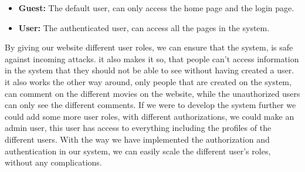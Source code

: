 \begin{itemize}
    \item \textbf{Guest:} The default user, can only access the home page and the login page.
    \item \textbf{User:} The authenticated user, can access all the pages in the system.
\end{itemize}

By giving our website different user roles, we can
ensure that the system, is safe against incoming
attacks. it also makes it so, that people can't access
information in the system that they should not be
able to see without having created a user.
it also works the other way around, only people
that are created on the system, can comment on the
different movies on the website, while the unauthorized users can only see the different comments. If
we were to develop the system further we could add
some more user roles, with different authorizations,
we could make an admin user, this user has access
to everything including the profiles of the different
users. With the way we have implemented the
authorization and authentication in our system, we
can easily scale the different user's roles, without any
complications. \newline

